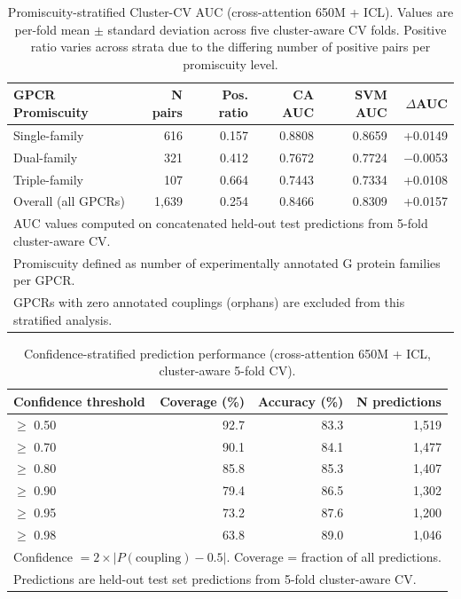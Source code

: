 \documentclass[11pt,a4paper]{article}
\begin{document}
\begin{table}[h!]
\centering
\caption{Promiscuity-stratified Cluster-CV AUC (cross-attention 650M + ICL). Values are per-fold mean $\pm$ standard deviation across five cluster-aware CV folds. Positive ratio varies across strata due to the differing number of positive pairs per promiscuity level.}
\label{tab:promiscuity_cv}
\begin{tabular}{lrrrrr}
\toprule
GPCR Promiscuity & N pairs & Pos. ratio & CA AUC & SVM AUC & $\Delta$AUC \\
\midrule
Single-family   & 616 & 0.157 & 0.8808 & 0.8659 & +0.0149 \\
Dual-family     & 321 & 0.412 & 0.7672 & 0.7724 & $-$0.0053 \\
Triple-family   & 107 & 0.664 & 0.7443 & 0.7334 & +0.0108 \\
\midrule
Overall (all GPCRs) & 1,639 & 0.254 & 0.8466 & 0.8309 & +0.0157 \\
\bottomrule
\multicolumn{6}{l}{\small AUC values computed on concatenated held-out test predictions from 5-fold cluster-aware CV.} \\
\multicolumn{6}{l}{\small Promiscuity defined as number of experimentally annotated G protein families per GPCR.} \\
\multicolumn{6}{l}{\small GPCRs with zero annotated couplings (orphans) are excluded from this stratified analysis.} \\
\end{tabular}
\end{table}

\begin{table}[h!]
\centering
\caption{Confidence-stratified prediction performance (cross-attention 650M + ICL, cluster-aware 5-fold CV).}
\label{tab:confidence}
\begin{tabular}{lrrr}
\toprule
Confidence threshold & Coverage (\%) & Accuracy (\%) & N predictions \\
\midrule
$\ge$ 0.50 & 92.7 & 83.3 & 1,519 \\
$\ge$ 0.70 & 90.1 & 84.1 & 1,477 \\
$\ge$ 0.80 & 85.8 & 85.3 & 1,407 \\
$\ge$ 0.90 & 79.4 & 86.5 & 1,302 \\
$\ge$ 0.95 & 73.2 & 87.6 & 1,200 \\
$\ge$ 0.98 & 63.8 & 89.0 & 1,046 \\
\bottomrule
\multicolumn{4}{l}{\small Confidence $= 2 \times |P(\text{coupling}) - 0.5|$. Coverage = fraction of all predictions.} \\
\multicolumn{4}{l}{\small Predictions are held-out test set predictions from 5-fold cluster-aware CV.} \\
\end{tabular}
\end{table}
\end{document}

